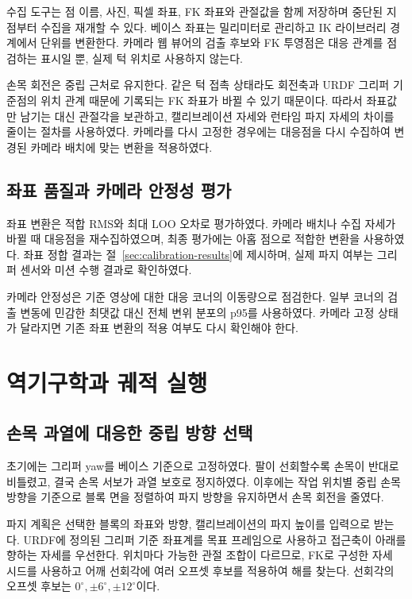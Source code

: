 수집 도구는 점 이름, 사진, 픽셀 좌표, FK 좌표와 관절값을 함께 저장하며 중단된 지점부터 수집을 재개할 수 있다. 베이스 좌표는 밀리미터로 관리하고 IK 라이브러리 경계에서 단위를 변환한다. 카메라 웹 뷰어의 검출 후보와 FK 투영점은 대응 관계를 점검하는 표시일 뿐, 실제 턱 위치로 사용하지 않는다.

손목 회전은 중립 근처로 유지한다. 같은 턱 접촉 상태라도 회전축과 URDF 그리퍼 기준점의 위치 관계 때문에 기록되는 FK 좌표가 바뀔 수 있기 때문이다. 따라서 좌표값만 남기는 대신 관절각을 보관하고, 캘리브레이션 자세와 런타임 파지 자세의 차이를 줄이는 절차를 사용하였다. 카메라를 다시 고정한 경우에는 대응점을 다시 수집하여 변경된 카메라 배치에 맞는 변환을 적용하였다.

\subsection{좌표 품질과 카메라 안정성 평가}
좌표 변환은 적합 RMS와 최대 LOO 오차로 평가하였다. 카메라 배치나 수집 자세가 바뀔 때 대응점을 재수집하였으며, 최종 평가에는 아홉 점으로 적합한 변환을 사용하였다. 좌표 정합 결과는 절~\ref{sec:calibration-results}에 제시하며, 실제 파지 여부는 그리퍼 센서와 미션 수행 결과로 확인하였다.

카메라 안정성은 기준 영상에 대한 대응 코너의 이동량으로 점검한다. 일부 코너의 검출 변동에 민감한 최댓값 대신 전체 변위 분포의 p95를 사용하였다. 카메라 고정 상태가 달라지면 기존 좌표 변환의 적용 여부도 다시 확인해야 한다.
\FloatBarrier
\section{역기구학과 궤적 실행}

\subsection{손목 과열에 대응한 중립 방향 선택}
초기에는 그리퍼 yaw를 베이스 기준으로 고정하였다. 팔이 선회할수록 손목이 반대로 비틀렸고, 결국 손목 서보가 과열 보호로 정지하였다. 이후에는 작업 위치별 중립 손목 방향을 기준으로 블록 면을 정렬하여 파지 방향을 유지하면서 손목 회전을 줄였다.

파지 계획은 선택한 블록의 좌표와 방향, 캘리브레이션의 파지 높이를 입력으로 받는다. URDF에 정의된 그리퍼 기준 좌표계를 목표 프레임으로 사용하고 접근축이 아래를 향하는 자세를 우선한다. 위치마다 가능한 관절 조합이 다르므로, FK로 구성한 자세 시드를 사용하고 어깨 선회각에 여러 오프셋 후보를 적용하여 해를 찾는다. 선회각의 오프셋 후보는 $0^\circ,\pm6^\circ,\pm12^\circ$이다.


